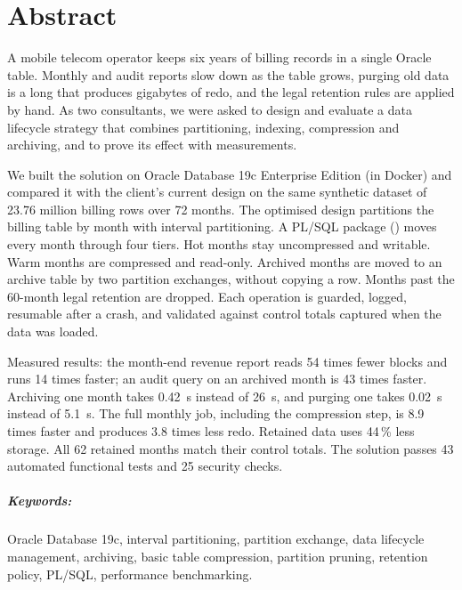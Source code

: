 \chapter*{Abstract}

A mobile telecom operator keeps six years of billing records in a single Oracle table. Monthly
and audit reports slow down as the table grows, purging old data is a long  that
produces gigabytes of redo, and the legal retention rules are applied by hand. As two
consultants, we were asked to design and evaluate a data lifecycle strategy that combines
partitioning, indexing, compression and archiving, and to prove its effect with measurements.

We built the solution on Oracle Database 19c Enterprise Edition (in Docker) and compared it
with the client's current design on the same synthetic dataset of 23.76 million billing rows
over 72 months. The optimised design partitions the billing table by month with interval
partitioning. A PL/SQL package () moves every month through four tiers. Hot
months stay uncompressed and writable. Warm months are compressed and read-only. Archived
months are moved to an archive table by two partition exchanges, without copying a row. Months
past the 60-month legal retention are dropped. Each operation is guarded, logged, resumable
after a crash, and validated against control totals captured when the data was loaded.

Measured results: the month-end revenue report reads 54 times fewer blocks and runs 14 times
faster; an audit query on an archived month is 43 times faster. Archiving one month takes
0.42~s instead of 26~s, and purging one takes 0.02~s instead of 5.1~s. The full monthly job,
including the compression step, is 8.9 times faster and produces 3.8 times less redo.
Retained data uses 44\,\% less storage. All 62 retained months match their control totals.
The solution passes 43 automated functional tests and 25 security checks.

\paragraph{Keywords:} Oracle Database 19c, interval partitioning, partition exchange, data
lifecycle management, archiving, basic table compression, partition pruning, retention policy,
PL/SQL, performance benchmarking.
